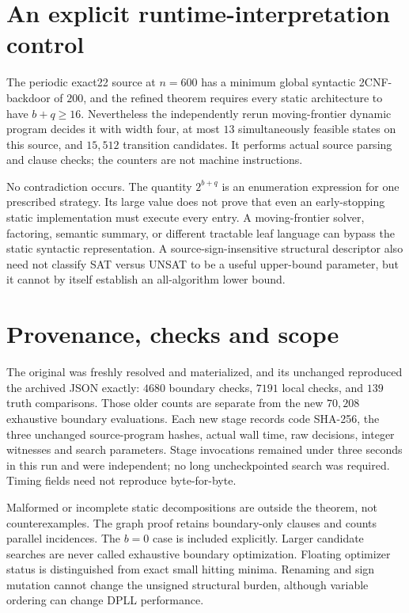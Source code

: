 \documentclass[11pt]{article}
\begin{document}
\section{An explicit runtime-interpretation control}
The periodic exact22 source at $n=600$ has a minimum global syntactic 2CNF-backdoor of $200$, and the refined theorem requires every static architecture to have $b+q\ge16$. Nevertheless the independently rerun moving-frontier dynamic program decides it with width four, at most $13$ simultaneously feasible states on this source, and $15{,}512$ transition candidates. It performs actual source parsing and clause checks; the counters are not machine instructions.

No contradiction occurs. The quantity $2^{b+q}$ is an enumeration expression for one prescribed strategy. Its large value does not prove that even an early-stopping static implementation must execute every entry. A moving-frontier solver, factoring, semantic summary, or different tractable leaf language can bypass the static syntactic representation. A source-sign-insensitive structural descriptor also need not classify SAT versus UNSAT to be a useful upper-bound parameter, but it cannot by itself establish an all-algorithm lower bound.

\section{Provenance, checks and scope}
The original  was freshly resolved and materialized, and its unchanged  reproduced the archived JSON exactly: $4680$ boundary checks, $7191$ local checks, and $139$ truth comparisons. Those older counts are separate from the new $70{,}208$ exhaustive boundary evaluations. Each new stage records code SHA-256, the three unchanged source-program hashes, actual wall time, raw decisions, integer witnesses and search parameters. Stage invocations remained under three seconds in this run and were independent; no long uncheckpointed search was required. Timing fields need not reproduce byte-for-byte.

Malformed or incomplete static decompositions are outside the theorem, not counterexamples. The graph proof retains boundary-only clauses and counts parallel incidences. The $b=0$ case is included explicitly. Larger candidate searches are never called exhaustive boundary optimization. Floating optimizer status is distinguished from exact small hitting minima. Renaming and sign mutation cannot change the unsigned structural burden, although variable ordering can change DPLL performance.
\end{document}
